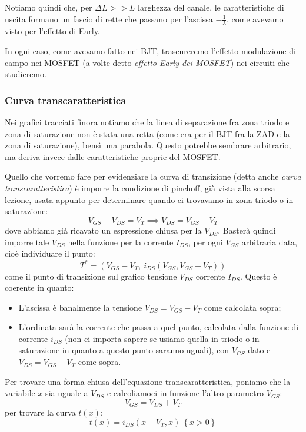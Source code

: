 \documentclass[a4paper,11pt]{article}
\begin{document}
Notiamo quindi che, per $\Delta L >> L$ larghezza del canale, le caratteristiche di uscita formano un fascio di rette che passano per l'ascissa $-\frac{1}{\lambda}$, come avevamo visto per l'effetto di Early.

In ogni caso, come avevamo fatto nei BJT, trascureremo l'effetto modulazione di campo nei MOSFET (a volte detto \textit{effetto Early dei MOSFET}) nei circuiti che studieremo.

\subsubsection{Curva transcaratteristica}
Nei grafici tracciati finora notiamo che la linea di separazione fra zona triodo e zona di saturazione non è stata una retta (come era per il BJT fra la ZAD e la zona di saturazione), bensì una parabola. Questo potrebbe sembrare arbitrario, ma deriva invece dalle caratteristiche proprie del MOSFET.

Quello che vorremo fare per evidenziare la curva di transizione (detta anche \textit{curva transcaratteristica}) è imporre la condizione di pinchoff, già vista alla scorsa lezione, usata appunto per determinare quando ci trovavamo in zona triodo o in saturazione:
$$
V_{GS} - V_{DS} = V_T \implies V_{DS} = V_{GS} - V_T
$$
dove abbiamo già ricavato un espressione chiusa per la $V_{DS}$.
Basterà quindi imporre tale $V_{DS}$ nella funzione per la corrente $I_{DS}$, per ogni $V_{GS}$ arbitraria data, cioè individuare il punto:
$$
T^* = \left(V_{GS}-V_{T},\ i_{DS}\left(V_{GS},V_{GS}-V_{T}\right)\right)
$$
come il punto di transizione sul grafico tensione $V_{DS}$ corrente $I_{DS}$.
Questo è coerente in quanto:
\begin{itemize}
	\item L'ascissa è banalmente la tensione $V_{DS} = V_{GS} - V_T$ come calcolata sopra;
	\item L'ordinata sarà la corrente che passa a quel punto, calcolata dalla funzione di corrente $i_{DS}$ (non ci importa sapere se usiamo quella in triodo o in saturazione in quanto a questo punto saranno uguali), con $V_{GS}$ dato e $V_{DS} = V_{GS} - V_T$ come sopra.
\end{itemize}

Per trovare una forma chiusa dell'equazione transcaratteristica, poniamo che la variabile $x$ sia uguale a $V_{DS}$ e calcoliamoci in funzione l'altro parametro $V_{GS}$:
$$
V_{GS} = V_{DS} + V_T
$$
per trovare la curva $t(x)$:
$$
t(x) = i_{DS}\left(x+V_{T},x\right)\ \left\{x>0\right\}
$$
\end{document}
